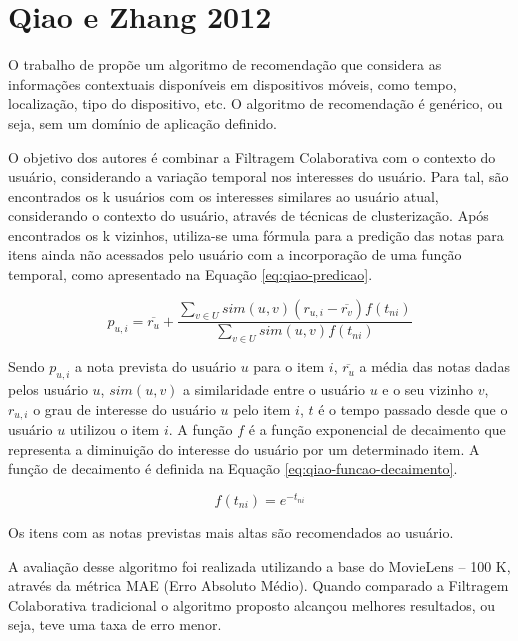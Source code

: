 \section{Qiao e Zhang 2012}

O trabalho de  propõe um algoritmo de recomendação que considera as informações
contextuais disponíveis em dispositivos móveis, como tempo, localização, tipo do dispositivo, etc. O algoritmo de
recomendação é genérico, ou seja, sem um domínio de aplicação definido.

O objetivo dos autores é combinar a Filtragem Colaborativa com o contexto do usuário, considerando a variação temporal
nos interesses do usuário. Para tal, são encontrados os k usuários com os interesses similares ao usuário atual,
considerando o contexto do usuário, através de técnicas de clusterização. Após encontrados os k vizinhos, utiliza-se
uma fórmula para a predição das notas para itens ainda não acessados pelo usuário com a incorporação de uma função
temporal, como apresentado na Equação \ref{eq:qiao-predicao}.

\begin{equation}
  \label{eq:qiao-predicao}
  p_{u,i} = \overline{r_u} + \frac{\sum_{v \in U}{sim(u, v)(r_{u,i} - \overline{r_v})f(t_{ni})}}{\sum_{v \in U}{sim(u, v)f(t_{ni})}}
\end{equation}

Sendo $p_{u,i}$ a nota prevista do usuário $u$ para o item $i$, $\overline{r_u}$ a média das notas dadas pelos usuário
$u$, $sim(u, v)$ a similaridade entre o usuário $u$ e o seu vizinho $v$, $r_{u,i}$ o grau de interesse do usuário $u$
pelo item $i$, $t$ é o tempo passado desde que o usuário $u$ utilizou o item $i$. A função $f$ é a função
exponencial de decaimento que representa a diminuição do interesse do usuário por um determinado item. A função de
decaimento é definida na Equação \ref{eq:qiao-funcao-decaimento}.

\begin{equation}
  \label{eq:qiao-funcao-decaimento}
  f(t_{ni}) = e^{-t_{ni}}
\end{equation}

Os itens com as notas previstas mais altas são recomendados ao usuário.

A avaliação desse algoritmo foi realizada utilizando a base do MovieLens – 100 K, através da métrica MAE (Erro Absoluto
Médio). Quando comparado a Filtragem Colaborativa tradicional o algoritmo proposto alcançou melhores resultados, ou
seja, teve uma taxa de erro menor.

